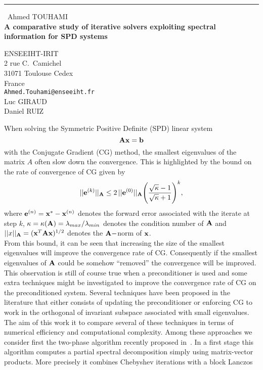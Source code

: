\documentclass{report}
\begin{document}
\begin{center}
\rule{6in}{1pt} \
{\large Ahmed TOUHAMI \\
{\bf A comparative study of iterative solvers exploiting spectral information for SPD systems}}

ENSEEIHT-IRIT \\ 2 rue C.~Camichel \\ 31071 Toulouse Cedex \\ France
\\
{\tt Ahmed.Touhami@enseeiht.fr}\\
Luc GIRAUD\\
Daniel RUIZ\end{center}

\newcommand{\Am}{{\bf A}}
\newcommand{\bv}{{\bf b}}
\newcommand{\xv}{{\bf x}}
\newcommand{\ev}{{\bf e}}
When solving the Symmetric Positive Definite (SPD) linear system
$$\Am \xv=\bv $$
with the Conjugate Gradient (CG) method, the smallest eigenvalues of the
matrix $A$ often slow down the convergence.
This is highlighted by the bound on the rate of convergence of CG given by
$$ ||\ev^{(k)}||_\Am \le 2\,||\ev^{(0)}||_\Am
\displaystyle\Bigg(\frac{\sqrt \kappa -1}{\sqrt \kappa + 1}\Bigg)^k,$$
where $\ev^{(n)}= \xv^* - \xv^{(n)}$ denotes the forward error associated
with the iterate at step $k$, $\displaystyle \kappa = \kappa(\Am) =
\lambda_{max} / \lambda_{min}$ denotes the condition number of $\Am$ and
$||x||_{\Am} = (\xv^T\Am\xv)^{1/2}$ denotes the $\Am-$norm of $\xv$. \\
From this bound, it can be seen that increasing the size of the smallest
eigenvalues will improve the convergence rate of CG.
Consequently if the smallest eigenvalues of $\Am$ could be somehow
``removed'' the convergence will be improved.
This observation is still of course true when a preconditioner is used and some
extra techniques might be investigated to improve the convergence rate of
CG on the preconditioned system.
Several techniques have been proposed in the literature that either consists of
updating the preconditioner or enforcing CG to work in the orthogonal of
invariant subspace associated with small eigenvalues.
The aim of this work it to compare several of these techniques in terms
of numerical efficiency and computational complexity.
Among these approaches we consider first the two-phase algorithm recently
proposed in~\cite{arru:02}.
In a first stage this algorithm computes a partial spectral decomposition
simply using matrix-vector products.
More precisely it combines Chebyshev iterations with a block Lanczos
\end{document}
